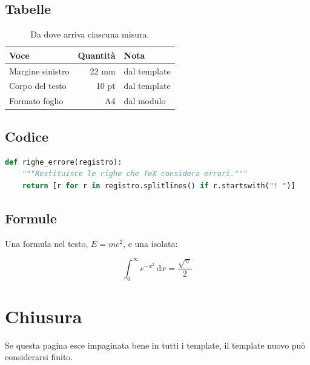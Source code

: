 \subsection{Tabelle}

\begin{table}[h]
  \centering
  \begin{tabular}{@{}lrl@{}}
    \toprule
    Voce & Quantità & Nota \\
    \midrule
    Margine sinistro & 22 mm & dal template \\
    Corpo del testo & 10 pt & dal template \\
    Formato foglio & A4 & dal modulo \\
    \bottomrule
  \end{tabular}
  \caption{Da dove arriva ciascuna misura.}
\end{table}

\subsection{Codice}

\begin{lstlisting}[language=Python,caption={Lettura di un registro di compilazione}]
def righe_errore(registro):
    """Restituisce le righe che TeX considera errori."""
    return [r for r in registro.splitlines() if r.startswith("! ")]
\end{lstlisting}

\subsection{Formule}

Una formula nel testo, $E = mc^2$, e una isolata:

\[
  \int_{0}^{\infty} e^{-x^{2}}\,\mathrm{d}x = \frac{\sqrt{\pi}}{2}
\]

\section{Chiusura}

Se questa pagina esce impaginata bene in tutti i template, il template nuovo
può considerarsi finito.
